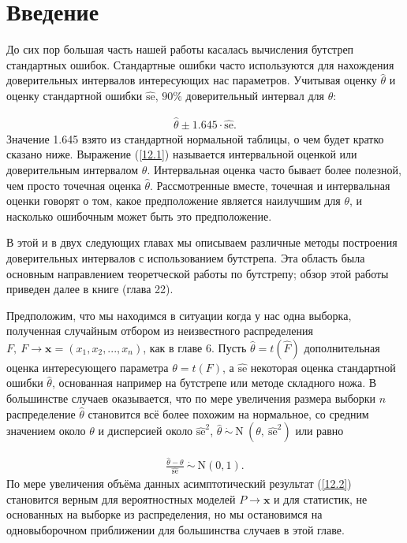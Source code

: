 \section{Введение}

До сих пор большая часть нашей работы касалась вычисления бутстреп стандартных ошибок. Стандартные ошибки часто используются для нахождения доверительных интервалов интересующих нас параметров. Учитывая оценку $\widehat{\theta}$ и оценку стандартной ошибки $\widehat{\text{se}}$, $ 90\% $ доверительный интервал для $\theta$:

\begin{gather}\label{12.1}
\widehat{\theta} \pm 1.645 \cdot \widehat{\text{se}}.
\end{gather}
Значение 1.645 взято из стандартной нормальной таблицы, о чем будет кратко сказано ниже. Выражение (\ref{12.1}) называется интервальной оценкой или доверительным интервалом $\theta$. Интервальная оценка часто бывает более полезной, чем просто точечная оценка $\widehat{\theta}$. Рассмотренные вместе, точечная и интервальная оценки говорят о том, какое предположение является наилучшим для $\theta$, и насколько ошибочным может быть это предположение. 

В этой и в двух следующих главах мы описываем различные методы построения доверительных интервалов с использованием бутстрепа. Эта область была основным направлением теоретческой работы по бутстрепу; обзор этой работы приведен далее в книге (глава 22).

Предположим, что мы находимся в ситуации когда у нас одна выборка, полученная случайным отбором из неизвестного распределения $F, \ F \rightarrow \mathbf{x} = (x_{1}, x_{2},..., x_{n})$, как в главе 6. Пусть $\widehat{\theta} = t(\widehat{F})$ дополнительная оценка интересующего параметра $\theta = t(F)$, а $\widehat{\text{se}}$ некоторая оценка стандартной ошибки $\widehat{\theta}$, основанная например на бутстрепе или методе складного ножа. В большинстве случаев оказывается, что по мере увеличения размера выборки $n$ распределение $\widehat{\theta}$ становится всё более похожим на нормальное, со средним значением около $\theta$ и дисперсией около $\widehat{\text{se}}^{2}$, $\widehat{\theta}  \ \dot{\sim}  \ \mathrm{N} \  (\theta, \  \widehat{\text{se}}^{2})$ или равно

\begin{gather}\label{12.2}
\frac{\widehat{\theta} - \theta}{\widehat{\text{se}}} \  \dot{\sim} \ \mathrm{N}(0,1).
\end{gather}
По мере увеличения объёма данных асимптотический результат (\ref{12.2}) становится верным для вероятностных моделей $P \rightarrow \mathbf{x}$ и для статистик, не основанных на выборке из распределения, но мы остановимся на одновыборочном приближении для большинства случаев в этой главе. 

